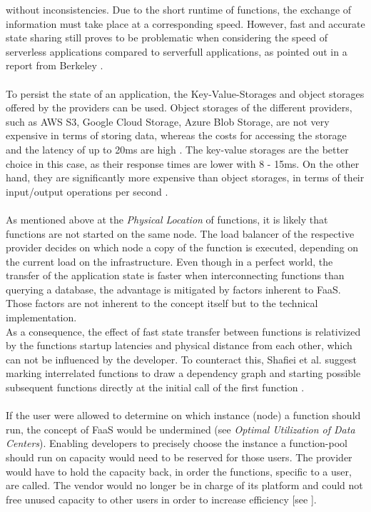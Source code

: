 \documentclass[a4paper,11pt, pagesize]{scrartcl}
\begin{document}
\begin{spacing}{1.2}
without inconsistencies. Due to the short runtime of functions, the exchange of information must take place at a corresponding speed. However, fast and accurate state sharing still proves to be problematic when considering the speed of serverless applications compared to serverfull applications, as pointed out in a report from Berkeley \cite{jonas2019cloud}.\\\\ To persist the state of an application, the Key-Value-Storages and object storages offered by the providers can be used. Object storages of the different providers, such as AWS S3, Google Cloud Storage, Azure Blob Storage, are not very expensive in terms of storing data, whereas the costs for accessing the storage and the latency of up to 20ms are high \cite{jonas2019cloud}. The key-value storages are the better choice in this case, as their response times are lower with 8 - 15ms. On the other hand, they are significantly more expensive than object storages, in terms of their input/output operations per second \cite{jonas2019cloud}.\\\\ As mentioned above at the \textit{Physical Location} of functions, it is likely that functions are not started on the same node. The load balancer of the respective provider decides on which node a copy of the function is executed, depending on the current load on the infrastructure. Even though in a perfect world, the transfer of the application state is faster when interconnecting functions than querying a database, the advantage is mitigated by factors inherent to FaaS. Those factors are not inherent to the concept itself but to the technical implementation.\\ As a consequence, the effect of fast state transfer between functions is relativized by the functions startup latencies and physical distance from each other, which can not be influenced by the developer. To counteract this, Shaﬁei et al. suggest marking interrelated functions to draw a dependency graph and starting possible subsequent functions directly at the initial call of the first function \cite{shafiei2020serverless}.\\\\ If the user were allowed to determine on which instance (node) a function should run, the concept of FaaS would be undermined (see \textit{Optimal Utilization of Data Centers}). Enabling developers to precisely choose the instance a function-pool should run on capacity would need to be reserved for those users. The provider would have to hold the capacity back, in order the functions, specific to a user, are called. The vendor would no longer be in charge of its platform and could not free unused capacity to other users in order to increase efficiency [see \cite{fowler2018serverless}]. 

\end{spacing}
\end{document}
